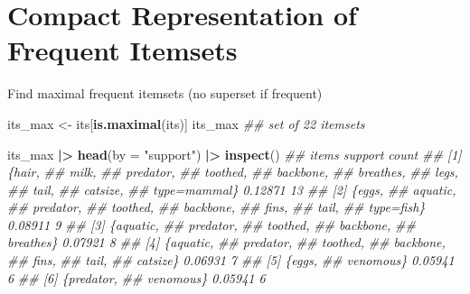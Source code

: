 \documentclass[
  notitlepage]{book}
\newenvironment{Shaded}{\begin{snugshade}}{\end{snugshade}}
\newcommand{\CommentTok}[1]{\textcolor[rgb]{0.56,0.35,0.01}{\textit{#1}}}
\newcommand{\DataTypeTok}[1]{\textcolor[rgb]{0.13,0.29,0.53}{#1}}
\newcommand{\ErrorTok}[1]{\textcolor[rgb]{0.64,0.00,0.00}{\textbf{#1}}}
\newcommand{\KeywordTok}[1]{\textcolor[rgb]{0.13,0.29,0.53}{\textbf{#1}}}
\newcommand{\NormalTok}[1]{#1}
\newcommand{\OperatorTok}[1]{\textcolor[rgb]{0.81,0.36,0.00}{\textbf{#1}}}
\newcommand{\StringTok}[1]{\textcolor[rgb]{0.31,0.60,0.02}{#1}}
\begin{document}
\hypertarget{compact-representation-of-frequent-itemsets}{%
\section{Compact Representation of Frequent Itemsets}\label{compact-representation-of-frequent-itemsets}}

Find maximal frequent itemsets (no superset if frequent)

\begin{Shaded}
\begin{Highlighting}[]
\NormalTok{its\_max \textless{}{-}}\StringTok{ }\NormalTok{its[}\KeywordTok{is.maximal}\NormalTok{(its)]}
\NormalTok{its\_max}
\CommentTok{\#\# set of 22 itemsets}
\end{Highlighting}
\end{Shaded}

\begin{Shaded}
\begin{Highlighting}[]
\NormalTok{its\_max }\OperatorTok{|}\ErrorTok{\textgreater{}}\StringTok{ }\KeywordTok{head}\NormalTok{(}\DataTypeTok{by =} \StringTok{"support"}\NormalTok{) }\OperatorTok{|}\ErrorTok{\textgreater{}}\StringTok{ }\KeywordTok{inspect}\NormalTok{()}
\CommentTok{\#\#     items         support count}
\CommentTok{\#\# [1] \{hair,                     }
\CommentTok{\#\#      milk,                     }
\CommentTok{\#\#      predator,                 }
\CommentTok{\#\#      toothed,                  }
\CommentTok{\#\#      backbone,                 }
\CommentTok{\#\#      breathes,                 }
\CommentTok{\#\#      legs,                     }
\CommentTok{\#\#      tail,                     }
\CommentTok{\#\#      catsize,                  }
\CommentTok{\#\#      type=mammal\} 0.12871    13}
\CommentTok{\#\# [2] \{eggs,                     }
\CommentTok{\#\#      aquatic,                  }
\CommentTok{\#\#      predator,                 }
\CommentTok{\#\#      toothed,                  }
\CommentTok{\#\#      backbone,                 }
\CommentTok{\#\#      fins,                     }
\CommentTok{\#\#      tail,                     }
\CommentTok{\#\#      type=fish\}   0.08911     9}
\CommentTok{\#\# [3] \{aquatic,                  }
\CommentTok{\#\#      predator,                 }
\CommentTok{\#\#      toothed,                  }
\CommentTok{\#\#      backbone,                 }
\CommentTok{\#\#      breathes\}    0.07921     8}
\CommentTok{\#\# [4] \{aquatic,                  }
\CommentTok{\#\#      predator,                 }
\CommentTok{\#\#      toothed,                  }
\CommentTok{\#\#      backbone,                 }
\CommentTok{\#\#      fins,                     }
\CommentTok{\#\#      tail,                     }
\CommentTok{\#\#      catsize\}     0.06931     7}
\CommentTok{\#\# [5] \{eggs,                     }
\CommentTok{\#\#      venomous\}    0.05941     6}
\CommentTok{\#\# [6] \{predator,                 }
\CommentTok{\#\#      venomous\}    0.05941     6}
\end{Highlighting}
\end{Shaded}
\end{document}
